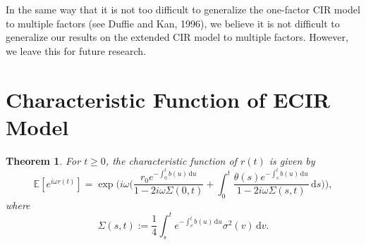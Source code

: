 \documentclass[6pt]{article}
\def\ud{\, \mathrm{d}}
\newtheorem{theorem}{Theorem}[section]
\numberwithin{equation}{section}
\begin{document}
In the same way that it is not too difficult to generalize the one-factor
CIR model to multiple factors (see Duffie and Kan, 1996), we believe it is
not difficult to generalize our results on the extended CIR model to
multiple factors. However, we leave this for future research.
\section{Characteristic Function of ECIR Model}
\begin{theorem}
\label{thm1}
For $t\ge0$, the characteristic function of $r(t)$ is given by
\begin{equation}  \label{CF}
\mathbb E[e^{i\omega r(t)}]=\exp \bigg( i\omega \Big( \frac{r_{0}e^{-%
\int_{0}^{t}b(u)\ud u}}{1-2i\omega \Sigma (0,t)}+\int_{0}^{t}\frac{\theta
(s)e^{-\int_{s}^{t}b(u)\ud u}}{1-2i\omega \Sigma (s,t)}\ud s\Big) \bigg),
\end{equation}%
where
$$
\Sigma (s,t):=\frac{1}{4}\int_{s}^{t}e^{-\int_{v}^{t}b(u)\ud u}\sigma ^{2}(v)\ud v.
$$
\end{theorem}
\end{document}
